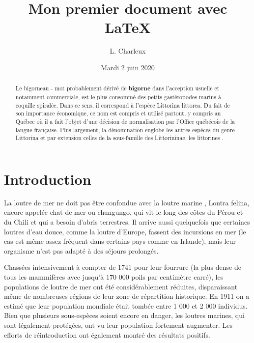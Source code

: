 \documentclass[a4paper, twoside]{article}
\title{Mon premier document avec \LaTeX} %
\author{L. Charleux}
\date{Mardi 2 juin 2020}
\begin{document}
\maketitle %


\begin{abstract}
Le bigorneau - mot probablement dérivé de \textbf{bigorne} dans l'acception usuelle et notamment commerciale, est le plus consommé des petits gastéropodes marins à coquille spiralée. Dans ce sens, il correspond à l'espèce Littorina littorea. Du fait de son importance économique, ce nom est compris et utilisé partout, y compris au Québec où il a fait l'objet d'une décision de normalisation par l'Office québécois de la langue française. Plus largement, la dénomination englobe les autres espèces du genre Littorina et par extension celles de la sous-famille des Littorininae, les \og littorines \fg. 
\end{abstract}

\tableofcontents %

\section*{Introduction} %

La loutre de mer ne doit pas être confondue avec la \og loutre marine \fg, Lontra felina, encore appelée chat de mer ou chungungo, qui vit le long des côtes du Pérou et du Chili et qui a besoin d'abris terrestres. 
Il arrive aussi quelquefois que certaines loutres d'eau douce, comme la loutre d'Europe, fassent des incursions en mer (le cas est même assez fréquent dans certains pays comme en Irlande), mais leur organisme n'est pas adapté à des séjours prolongés. 

Chassées intensivement à compter de 1741 pour leur fourrure (la plus dense de tous les mammifères avec jusqu'à 170 000 poils par centimètre carré), les populations de loutre de mer ont été considérablement réduites, disparaissant même de nombreuses régions de leur zone de répartition historique. 
En 1911 on a estimé que leur population mondiale était tombée entre 1 000 et 2 000 individus. 
Bien que plusieurs sous-espèces soient encore en danger, les loutres marines, qui sont légalement protégées, ont vu leur population fortement augmenter. Les efforts de réintroduction ont également montré des résultats positifs.
\end{document}
